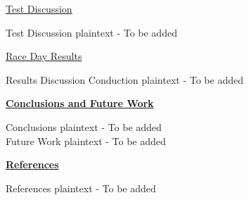 \documentclass[twocolumn]{article}
\newcommand{\sectionTitle}[1]{ {\large\textbf{\uline{#1}}} \\ \vspace{1.5em} }
\newcommand{\subsectionTitle}[1]{ {\hspace{2em}\uline{#1}} \\ \vspace{1em} }
\newcommand{\textTestDiscussion}{Test Discussion plaintext - To be added}
\newcommand{\textRaceResults}{Results Discussion Conduction plaintext - To be added}
\newcommand{\textConclusions}{Conclusions plaintext - To be added}
\newcommand{\textFutureWork}{Future Work plaintext - To be added}
\newcommand{\textReferences}{References plaintext - To be added}
\begin{document}
\begin{flushleft}
			\subsectionTitle{Test Discussion}

			\textTestDiscussion \\ \vspace{1em}
			
			\subsectionTitle{Race Day Results}

			\textRaceResults \\ \vspace{1em}
			
		\sectionTitle{Conclusions and Future Work}
			
		\textConclusions \\ \vspace{1em}
		\textFutureWork \\ \vspace{1em}
			
		\sectionTitle{References}
			
		\textReferences \\ \vspace{1em}

	\end{flushleft}
	
	
\end{document}

